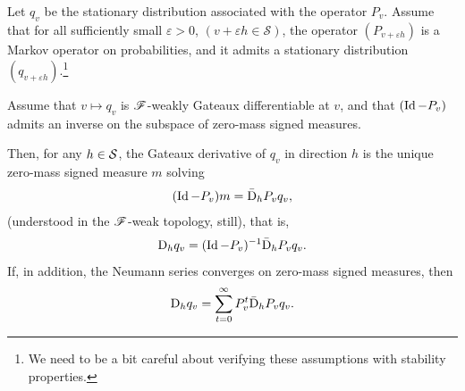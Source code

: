 \documentclass[twoside,10pt]{../jmlr}
\begin{document}
\begin{lemma}\label{lemma: derivative of q_v}
    Let $q_v$ be the stationary distribution associated with the operator $P_v$. Assume that for all sufficiently small $\varepsilon>0$, $(v+\varepsilon h\in\mathcal S)$, the operator $(P_{v+\varepsilon h})$ is a Markov operator on probabilities, and it admits a stationary distribution $(q_{v+\varepsilon h})$.\footnote{We need to be a bit careful about verifying these assumptions with stability properties.}
    
    Assume that $v\mapsto q_v$ is $\mathscr{F}$-weakly Gateaux differentiable at $v$, and that $(\operatorname{Id}-P_v)$ admits an inverse on the subspace of zero-mass signed measures. 
    
    Then, for any $h\in\mathcal{S}$, the Gateaux derivative of $q_v$ in direction $h$ is the unique zero-mass signed measure $m$ solving
    \begin{align}
        (\operatorname{Id}-P_v) m =\bar{\mathrm{D}}_h P_v q_v,
    \end{align}
    (understood in the $\mathscr{F}$-weak topology, still), that is,
    \begin{align}
        \mathrm{D}_h q_v=(\operatorname{Id}-P_v)^{-1}\bar{\mathrm{D}}_h P_v q_v.
    \end{align}
    If, in addition, the Neumann series converges on zero-mass signed measures, then
    \begin{align}
        \mathrm{D}_h q_v=\sum_{t=0}^\infty P_v^t\bar{\mathrm{D}}_h P_v q_v.
    \end{align}
\end{lemma}
\end{document}
